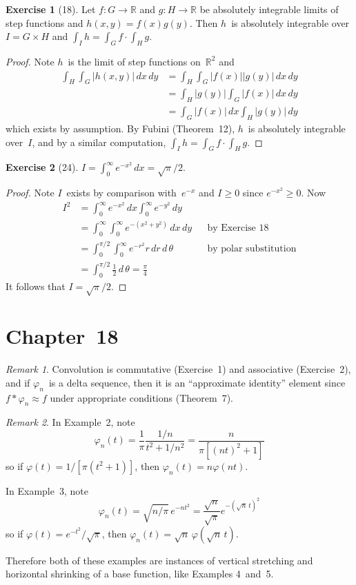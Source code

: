 \documentclass[letterpaper,12pt]{article}
\newcommand{\R}{\mathbb{R}}
\newcommand{\conv}{\ast}
\renewcommand{\d}[1]{\,d\!{#1}}
\newcommand{\dx}{\d{x}}
\newcommand{\dy}{\d{y}}
\newcommand{\abs}[1]{|{#1}|}
\theoremstyle{plain}
\theoremstyle{definition}
\newtheorem*{exer}{Exercise}
\theoremstyle{remark}
\newtheorem*{rmk}{Remark}
\begin{document}
\begin{exer}[18]
Let \(f:G\to\R\) and \(g:H\to\R\) be absolutely integrable limits of step functions and \(h(x,y)=f(x)g(y)\). Then \(h\)~is absolutely integrable over \(I=G\times H\) and \(\int_I h=\int_G f\cdot\int_H g\).
\end{exer}
\begin{proof}
Note \(h\)~is the limit of step functions on~\(\R^2\) and
\begin{align*}
\int_H\int_G\abs{h(x,y)}\dx\dy&=\int_H\int_G\abs{f(x)}\abs{g(y)}\dx\dy\\
	&=\int_H\abs{g(y)}\int_G\abs{f(x)}\dx\dy\\
	&=\int_G\abs{f(x)}\dx\int_H\abs{g(y)}\dy
\end{align*}
which exists by assumption. By Fubini (Theorem~12), \(h\)~is absolutely integrable over~\(I\), and by a similar computation, \(\int_I h=\int_G f\cdot\int_H g\).
\end{proof}

\begin{exer}[24]
\(I=\int_0^{\infty}e^{-x^2}\dx=\sqrt{\pi}/2\).
\end{exer}
\begin{proof}
Note \(I\)~exists by comparison with~\(e^{-x}\) and \(I\ge 0\) since \(e^{-x^2}\ge 0\). Now
\begin{align*}
I^2&=\int_0^{\infty}e^{-x^2}\dx\int_0^{\infty}e^{-y^2}\dy&&\\
	&=\int_0^{\infty}\int_0^{\infty}e^{-(x^2+y^2)}\dx\dy&&\text{by Exercise~18}\\
	&=\int_0^{\pi/2}\int_0^{\infty}e^{-r^2}r\d{r}\d{\,\theta}&&\text{by polar substitution}\\
	&=\int_0^{\pi/2}\frac{1}{2}\d{\,\theta}=\frac{\pi}{4}&&
\end{align*}
It follows that \(I=\sqrt{\pi}/2\).
\end{proof}

\section*{Chapter~18}
\begin{rmk}
Convolution is commutative (Exercise~1) and associative (Exercise~2), and if \(\varphi_n\)~is a delta sequence, then it is an ``approximate identity'' element since \(f\conv\varphi_n\approx f\) under appropriate conditions (Theorem~7).
\end{rmk}

\begin{rmk}
In Example~2, note
\[\varphi_n(t)=\frac{1}{\pi}\frac{1/n}{t^2+1/n^2}=\frac{n}{\pi[(nt)^2+1]}\]
so if \(\varphi(t)=1/[\pi(t^2+1)]\), then \(\varphi_n(t)=n\varphi(nt)\).

In Example~3, note
\[\varphi_n(t)=\sqrt{n/\pi}\,e^{-nt^2}=\frac{\sqrt{n}}{\sqrt{\pi}}e^{-(\sqrt{n}\,t)^2}\]
so if \(\varphi(t)=e^{-t^2}/\sqrt{\pi}\), then \(\varphi_n(t)=\sqrt{n}\,\varphi(\sqrt{n}\,t)\).

Therefore both of these examples are instances of vertical stretching and horizontal shrinking of a base function, like Examples 4~and~5.
\end{rmk}
\end{document}
